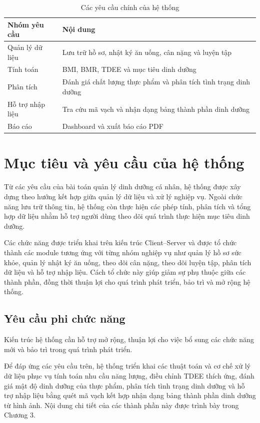 \documentclass[12pt, a4paper]{report}
\begin{document}
\begin{table}[H]
    \centering
    \caption{Các yêu cầu chính của hệ thống}
    \label{tab:yeu_cau_he_thong}
    \vspace{4pt}
    \renewcommand{\arraystretch}{1.3}
    \begin{tabular}{|p{4cm}|p{11cm}|}
        \hline
        \textbf{Nhóm yêu cầu} & \textbf{Nội dung} \\
        \hline
        Quản lý dữ liệu & Lưu trữ hồ sơ, nhật ký ăn uống, cân nặng và luyện tập \\
        \hline
        Tính toán & BMI, BMR, TDEE và mục tiêu dinh dưỡng \\
        \hline
        Phân tích & Đánh giá chất lượng thực phẩm và phân tích tình trạng dinh dưỡng \\
        \hline
        Hỗ trợ nhập liệu & Tra cứu mã vạch và nhận dạng bảng thành phần dinh dưỡng \\
        \hline
        Báo cáo & Dashboard và xuất báo cáo PDF \\
        \hline
    \end{tabular}
\end{table}
\section{Mục tiêu và yêu cầu của hệ thống}Từ các yêu cầu của bài toán quản lý dinh dưỡng cá nhân, hệ thống được xây dựng theo hướng kết hợp giữa quản lý dữ liệu và xử lý nghiệp vụ. Ngoài chức năng lưu trữ thông tin, hệ thống còn thực hiện các phép tính, phân tích và tổng hợp dữ liệu nhằm hỗ trợ người dùng theo dõi quá trình thực hiện mục tiêu dinh dưỡng.

Các chức năng được triển khai trên kiến trúc Client–Server và được tổ chức thành các module tương ứng với từng nhóm nghiệp vụ như quản lý hồ sơ sức khỏe, quản lý nhật ký ăn uống, theo dõi cân nặng, theo dõi luyện tập, phân tích dữ liệu và hỗ trợ nhập liệu. Cách tổ chức này giúp giảm sự phụ thuộc giữa các thành phần, đồng thời thuận lợi cho quá trình phát triển, bảo trì và mở rộng hệ thống.

\subsection{Yêu cầu phi chức năng}Kiến trúc hệ thống cần hỗ trợ mở rộng, thuận lợi cho việc bổ sung các chức năng mới và bảo trì trong quá trình phát triển.

Để đáp ứng các yêu cầu trên, hệ thống triển khai các thuật toán và cơ chế xử lý dữ liệu phục vụ tính toán nhu cầu năng lượng, điều chỉnh TDEE thích ứng, đánh giá mật độ dinh dưỡng của thực phẩm, phân tích tình trạng dinh dưỡng và hỗ trợ nhập liệu bằng quét mã vạch kết hợp nhận dạng bảng thành phần dinh dưỡng từ hình ảnh. Nội dung chi tiết của các thành phần này được trình bày trong Chương 3.
\end{document}
